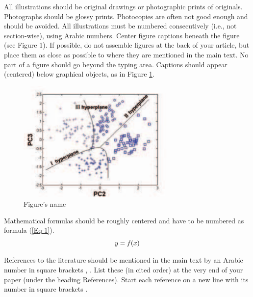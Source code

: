 \documentclass[a4paper, times, 10pt,twocolumn]{article}
\begin{document}
All illustrations should be original drawings or photographic prints
of originals. Photographs should be glossy prints. Photocopies are
often not good enough and should be avoided. All illustrations must
be numbered consecutively (i.e., not section-wise), using Arabic
numbers.  Center figure captions beneath the figure (see Figure 1).
If possible, do not assemble figures at the back of your article,
but place them as close as possible to where they are mentioned in
the main text. No part of a figure should go beyond the typing area.
Captions should appear (centered) below graphical objects, as in
Figure \ref{Fig:Figure 1}.
\begin{figure}[h]
\centering
\includegraphics[width=8cm,height=6cm]{figure1}
\caption{Figure's name} \label{Fig:Figure 1}
\end{figure}


Mathematical formulas should be roughly centered and have to be
numbered as formula (\ref{Eq-1}).
\begin{equation}\label{Eq-1}
\centering{y=f(x)}
\end{equation}


References to the literature should be mentioned in the main text by
an Arabic number in square brackets \cite{Peter}, \cite{John}. List
these (in cited order) at the very end of your paper (under the
heading References). Start each reference on a new line with its
number in square brackets \cite{Xizhao}.

\end{document}
